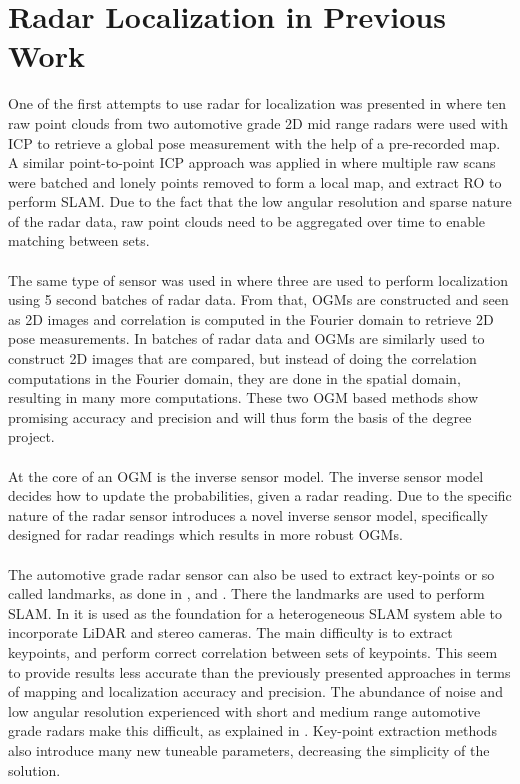 \section{Radar Localization in Previous Work}
One of the first attempts to use radar for localization was presented in \cite{ward_vehicle_2016} where ten raw point clouds from two automotive grade 2D mid range radars were used with \ac{ICP} to retrieve a global pose measurement with the help of a pre-recorded map. A similar point-to-point ICP approach was applied in \cite{holder_real-time_2019} where multiple raw scans were batched and lonely points removed to form a local map, and extract \ac{RO} to perform \ac{SLAM}. Due to the fact that the low angular resolution and sparse nature of the radar data, raw point clouds need to be aggregated over time to enable matching between sets. 
\\\\
The same type of sensor was used in \cite{narula_automotive-radar-based_2020} where three are used to perform localization using 5 second batches of radar data. From that,  \ac{OGM}s are constructed and seen as 2D images and correlation is computed in the Fourier domain to retrieve 2D pose measurements. In \cite{yoneda_vehicle_2018} batches of radar data and OGMs are similarly used to construct 2D images that are compared, but instead of doing the correlation computations in the Fourier domain, they are done in the spatial domain, resulting in many more computations. These two OGM based methods show promising accuracy and precision and will thus form the basis of the degree project. 
\\\\
At the core of an OGM is the inverse sensor model. The inverse sensor model decides how to update the probabilities, given a radar reading. Due to the specific nature of the radar sensor \cite{slutsky_dual_2019} introduces a novel inverse sensor model, specifically designed for radar readings which results in more robust OGMs.
\\\\
The automotive grade radar sensor can also be used to extract key-points or so called landmarks, as done in \cite{jurgens_radar-based_2020}, and \cite{schuster_landmark_2016}. There the landmarks are used to perform SLAM. In \cite{jurgens_radar-based_2020} it is used as the foundation for a heterogeneous SLAM system able to incorporate \ac{LiDAR} and stereo cameras. The main difficulty is to extract keypoints, and perform correct correlation between sets of keypoints. This seem to provide results less accurate than the previously presented approaches in terms of mapping and localization accuracy and precision. The abundance of noise and low angular resolution experienced with short and medium range automotive grade radars make this difficult, as explained in \cite{holder_real-time_2019}. Key-point extraction methods also introduce many new tuneable parameters, decreasing the simplicity of the solution.
